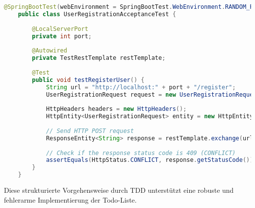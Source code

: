 \begin{lstlisting}[language=Java]
	@SpringBootTest(webEnvironment = SpringBootTest.WebEnvironment.RANDOM_PORT)
	public class UserRegistrationAcceptanceTest {
		
		@LocalServerPort
		private int port;
		
		@Autowired
		private TestRestTemplate restTemplate;
		
		@Test
		public void testRegisterUser() {
			String url = "http://localhost:" + port + "/register";
			UserRegistrationRequest request = new UserRegistrationRequest("testuser", "password", "password");
			
			HttpHeaders headers = new HttpHeaders();
			HttpEntity<UserRegistrationRequest> entity = new HttpEntity<>(request, headers);
			
			// Send HTTP POST request
			ResponseEntity<String> response = restTemplate.exchange(url, HttpMethod.POST, entity, String.class);
			
			// Check if the response status code is 409 (CONFLICT)
			assertEquals(HttpStatus.CONFLICT, response.getStatusCode());
		}
	}
\end{lstlisting}

Diese strukturierte Vorgehensweise durch TDD unterstützt eine robuste und fehlerarme Implementierung der Todo-Liste.

